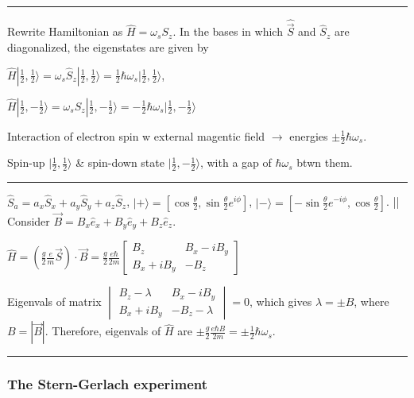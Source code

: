 \hrule height 0.05pt

Rewrite Hamiltonian as $\widehat{H} = \omega_s S_z$. In the bases in which $\widehat{\vec{S}}$ and $\widehat{S}_z$ are diagonalized, the eigenstates are given by 

$\widehat{H} | \frac{1}{2}, \frac{1}{2} \rangle = \omega_s \widehat{S}_z | \frac{1}{2}, \frac{1}{2} \rangle = \frac{1}{2} \hbar \omega_s | \frac{1}{2}, \frac{1}{2} \rangle$, 

$\widehat{H} | \frac{1}{2}, -\frac{1}{2} \rangle = \omega_s \widehat{S}_z | \frac{1}{2}, -\frac{1}{2} \rangle = - \frac{1}{2} \hbar \omega_s | \frac{1}{2}, -\frac{1}{2} \rangle$

Interaction of electron spin w external magentic field $\rightarrow$ energies $\pm \frac{1}{2} \hbar \omega_s$. 

Spin-up $| \frac{1}{2}, \frac{1}{2} \rangle$ \& spin-down state $|\frac{1}{2}, -\frac{1}{2} \rangle$, with a gap of $\hbar \omega_s$ btwn them.

\hrule height 0.05pt


$\widehat{S}_a = a_x \widehat{S}_x + a_y \widehat{S}_y + a_z \widehat{S}_z$, $|+ \rangle = [\cos\frac{\theta}{2}, \sin \frac{\theta}{2} e^{i \phi} ]$, $|- \rangle = [- \sin \frac{\theta}{2} e^{-i \phi}, \cos \frac{\theta}{2}]$. || 
Consider $\vec{B} = B_x \widehat{e}_x + B_y \widehat{e}_y + B_z \widehat{e}_z$. 

$\widehat{H} = (\frac{g}{2} \frac{e}{m} \vec{S}) \cdot \vec{B} = \frac{g}{2} \frac{e \hbar}{2m} \begin{bmatrix} B_z & B_x - i B_y \\ B_x + i B_y & -B_z \end{bmatrix}$

Eigenvals of matrix $\begin{vmatrix} B_z - \lambda & B_x - iB_y \\ B_x + iB_y & -B_z - \lambda \end{vmatrix} = 0$, which gives $\lambda = \pm B$, where $B = |\vec{B}|$. Therefore, eigenvals of $\widehat{H}$ are $\pm \frac{g}{2} \frac{e \hbar B}{2m} = \pm \frac{1}{2} \hbar \omega_s$.

\hrule height 0.05pt

\subsubsection{The Stern-Gerlach experiment} \hfill

